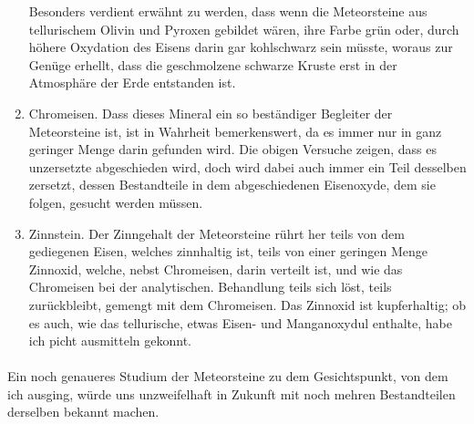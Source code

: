 \documentclass[a4paper, 11pt, oneside]{article}
\begin{document}
\begin{enumerate}
    Besonders verdient erwähnt zu werden, dass wenn die Meteorsteine aus tellurischem Olivin und Pyroxen gebildet wären, ihre Farbe grün oder, durch höhere Oxydation des Eisens darin gar kohlschwarz sein müsste, woraus zur Genüge erhellt, dass die geschmolzene schwarze Kruste erst in der Atmosphäre der Erde entstanden ist.
    \item Chromeisen. Dass dieses Mineral ein so beständiger Begleiter der Meteorsteine ist, ist in Wahrheit bemerkenswert, da es immer nur in ganz geringer Menge darin gefunden wird. Die obigen Versuche zeigen, dass es unzersetzte abgeschieden wird, doch wird dabei auch immer ein Teil desselben zersetzt, dessen Bestandteile in dem abgeschiedenen Eisenoxyde, dem sie folgen, gesucht werden müssen.
    \item Zinnstein. Der Zinngehalt der Meteorsteine rührt her teils von dem gediegenen Eisen, welches zinnhaltig ist, teils von einer geringen Menge Zinnoxid, welche, nebst Chromeisen, darin verteilt ist, und wie das Chromeisen bei der analytischen. Behandlung teils sich löst, teils zurückbleibt, gemengt mit dem Chromeisen. Das Zinnoxid ist kupferhaltig; ob es auch, wie das tellurische, etwas Eisen- und Manganoxydul enthalte, habe ich picht ausmitteln gekonnt.
\end{enumerate}
\paragraph{}
Ein noch genaueres Studium der Meteorsteine zu dem Gesichtspunkt, von dem ich ausging, würde uns unzweifelhaft in Zukunft mit noch mehren Bestandteilen derselben bekannt machen.
\end{document}
